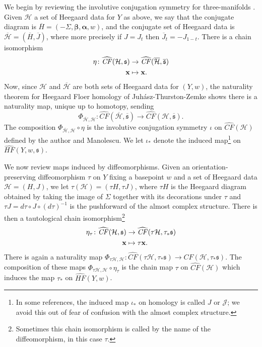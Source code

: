 \documentclass[11pt,reqno]{amsart}
\theoremstyle{definition}
\theoremstyle{remark}
\newcommand{\alphas}{\boldsymbol \alpha}
\newcommand{\betas}{\boldsymbol \beta}
\newcommand{\cH}{\mathcal{H}}
\newcommand{\CF}{\mathit{CF}}
\newcommand{\CFhat}{\widehat{\CF}}
\newcommand{\HF}{\mathit{HF}}
\newcommand\HFhat{\widehat{\HF}}
\numberwithin{equation}{section}
\newcommand\co{\colon}
\begin{document}
We begin by reviewing the involutive conjugation symmetry for three-manifolds \cite{HMInvolutive}. Given $\cH$ a set of Heegaard data for $Y$ as above, we say that the conjugate diagram is $\overline{H} = (-\Sigma, \betas, \alphas, w)$, and the conjugate set of Heegaard data is $\overline{\cH} =(\overline{H}, \overline{J})$, where more precisely if $J=J_t$ then $\overline{J}_t = -J_{1-t}$. There is a chain isomorphism
%
\begin{align*} \eta \co \CFhat(\cH, \mathfrak s) &\rightarrow \CFhat(\overline{\cH}, \overline{\mathfrak s}) \\
							{\bf x} &\mapsto {\bf x}.
\end{align*}
%
Now, since $\cH$ and $\overline{\cH}$ are both sets of Heegaard data for $(Y,w)$, the naturality theorem for Heegaard Floer homology of Juh{\'a}sz-Thurston-Zemke \cite{JTNaturality} shows there is a naturality map, unique up to homotopy, sending
%
\[ \Phi_{\overline{\cH}, \cH} \co \CFhat(\overline{\cH}, \overline{\mathfrak s}) \rightarrow \CFhat(\cH, \overline{\mathfrak s}).\]
%
The composition $\Phi_{\overline{\cH}, \cH} \circ \eta$ is the involutive conjugation symmetry $\iota$ on $\CFhat(\cH)$ defined by the author and Manolescu. We let $\iota_*$ denote the induced map\footnote{In some references, the induced map $\iota_*$ on homology is called $J$ or $\mathcal J$; we avoid this out of fear of confusion with the almost complex structure.} on $\HFhat(Y,w, \mathfrak s)$.

We now review maps induced by diffeomorphisms. Given an orientation-preserving diffeomorphism $\tau$ on $Y$ fixing a basepoint $w$ and a set of Heegaard data $\cH = (H, J)$, we let $\tau(\cH) = (\tau H, \tau J)$, where $\tau H$ is the Heegaard diagram obtained by taking the image of $\Sigma$ together with its decorations under $\tau$ and $\tau J = d\tau \circ J \circ (d\tau)^{-1}$ is the pushforward of the almost complex structure. There is then a tautological chain isomorphism\footnote{Sometimes this chain isomorphism is called by the name of the diffeomorphism, in this case $\tau$.}
%
\begin{align*} \eta_{\tau} \co \CFhat(\cH, \mathfrak s) &\rightarrow \CFhat(\tau\cH, \tau_* \mathfrak s) \\
						{\bf x} &\mapsto \tau{\bf x}. \end{align*}
%
There is again a naturality map $\Phi_{\tau \cH, \cH} \co \CFhat(\tau\cH, \tau_* \mathfrak s) \rightarrow \CFhat(\cH, \tau_* \mathfrak s)$. The composition of these maps $\Phi_{\tau \cH, \cH} \circ \eta_{\tau}$ is the chain map $\tau$ on $\CFhat(\cH)$ which induces the map $\tau_*$ on $\HFhat(Y, w)$.
\end{document}
